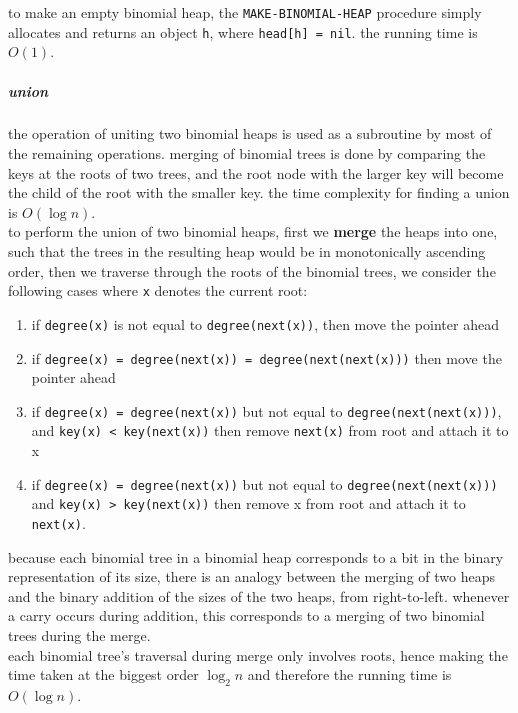 \documentclass[a4paper,12pt]{article}
\begin{document}
to make an empty binomial heap, the \texttt{MAKE-BINOMIAL-HEAP} procedure simply allocates and returns an object \texttt{h}, where \texttt{head[h] = nil}. the running time is \(O(1)\).\\[0pt]
\subparagraph{union}
\label{sec:org6a4cc43}
the operation of uniting two binomial heaps is used as a subroutine by most of the remaining operations. merging of binomial trees is done by comparing the keys at the roots of two trees, and the root node with the larger key will become the child of the root with the smaller key. the time complexity for finding a union is \(O(\log n)\).\\[0pt]
to perform the union of two binomial heaps, first we \textbf{merge} the heaps into one, such that the trees in the resulting heap would be in monotonically ascending order, then we traverse through the roots of the binomial trees, we consider the following cases where \texttt{x} denotes the current root:\\[0pt]
\begin{enumerate}
\item if \texttt{degree(x)} is not equal to \texttt{degree(next(x))}, then move the pointer ahead\\[0pt]
\item if \texttt{degree(x) = degree(next(x)) = degree(next(next(x)))} then move the pointer ahead\\[0pt]
\item if \texttt{degree(x) = degree(next(x))} but not equal to \texttt{degree(next(next(x)))}, and \texttt{key(x) < key(next(x))} then remove \texttt{next(x)} from root and attach it to x\\[0pt]
\item if \texttt{degree(x) = degree(next(x))} but not equal to \texttt{degree(next(next(x)))} and \texttt{key(x) > key(next(x))} then remove x from root and attach it to \texttt{next(x)}.\\[0pt]
\end{enumerate}
because each binomial tree in a binomial heap corresponds to a bit in the binary representation of its size, there is an analogy between the merging of two heaps and the binary addition of the sizes of the two heaps, from right-to-left. whenever a carry occurs during addition, this corresponds to a merging of two binomial trees during the merge.\\[0pt]
each binomial tree's traversal during merge only involves roots, hence making the time taken at the biggest order \(\log_2n\) and therefore the running time is \(O(\log n)\).\\[0pt]
\end{document}
